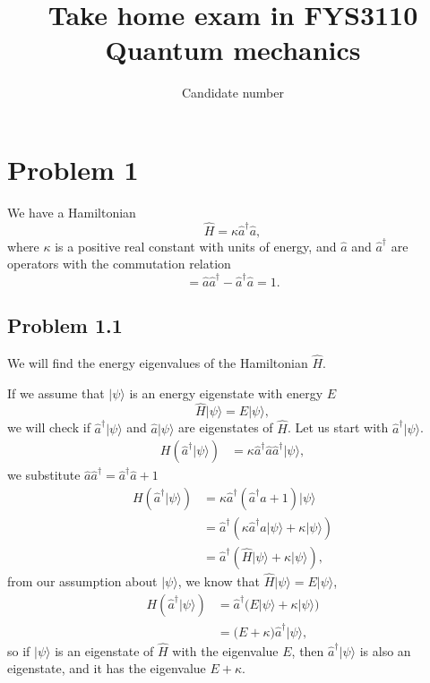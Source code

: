 \documentclass[a4paper, 11pt, titlepage, english]{article}
\author{Candidate number }
\title{Take home exam in FYS3110\\ Quantum mechanics}
\newcommand{\ket}[1]{|#1 \rangle}
\newcommand{\op}[1]{\hat{#1}}
\begin{document}
\maketitle

\setcounter{page}{1} 

\section*{Problem 1}
We have a Hamiltonian
\begin{equation}
\op{H} = \kappa \op{a}^\dag\op{a}, \label{eq:H}
\end{equation}
where $\kappa$ is a positive real constant with units of energy, and $\op{a}$ and $\op{a}^\dag$ are operators with the commutation relation
\begin{equation}
[\op{a},\op{a}^\dag] = \op{a}\op{a}^\dag - \op{a}^\dag\op{a} = 1. \label{eq:commutator}
\end{equation}

\subsection*{Problem 1.1}
We will find the energy eigenvalues of the Hamiltonian $\op{H}$.

If we assume that $\ket{\psi}$ is an energy eigenstate with energy $E$
$$\op{H}\ket{\psi} = E\ket{\psi},$$
we will check if $\op{a}^\dag\ket{\psi}$ and $\op{a}\ket{\psi}$ are eigenstates of $\op{H}$. Let us start with $\op{a}^\dag\ket{\psi}$.
\begin{align*}
{H}\left(\op{a}^\dag \ket{\psi}\right) &= \kappa\op{a}^\dag\op{a}\op{a}^\dag \ket{\psi},
\end{align*}
we substitute $\op{a}\op{a}^\dag = \op{a}^\dag\op{a} + 1$
\begin{align*}
{H}\left(\op{a}^\dag \ket{\psi}\right) &= \kappa\op{a}^\dag\left(\op{a}^\dag\op{a} + 1\right) \ket{\psi} \\
&= \op{a}^\dag\left(\kappa\op{a}^\dag\op{a}\ket{\psi} + \kappa\ket{\psi}\right) \\
&= \op{a}^\dag\left(\op{H}\ket{\psi} + \kappa\ket{\psi}\right),
\end{align*}
from our assumption about $\ket{\psi}$, we know that $\op{H}\ket{\psi} = E\ket{\psi}$,
\begin{align*}
{H}\left(\op{a}^\dag \ket{\psi}\right) &= \op{a}^\dag\Bigg(E\ket{\psi} + \kappa\ket{\psi}\Bigg) \\
&= \Bigg(E + \kappa\Bigg) \op{a}^\dag \ket{\psi},
\end{align*}
so if $\ket{\psi}$ is an eigenstate of $\op{H}$ with the eigenvalue $E$, then $\op{a}^\dag\ket{\psi}$ is also an eigenstate, and it has the eigenvalue $E+\kappa$.
\end{document}
